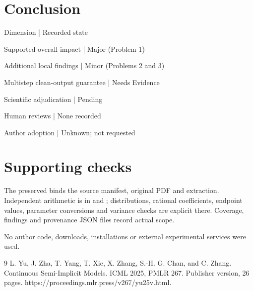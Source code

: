 \documentclass[10pt]{article}
\begin{document}
\section*{Conclusion}
Dimension | Recorded state\par
Supported overall impact | Major (Problem 1)\par
Additional local findings | Minor (Problems 2 and 3)\par
Multistep clean-output guarantee | Needs Evidence\par
Scientific adjudication | Pending\par
Human reviews | None recorded\par
Author adoption | Unknown; not requested\par
\section*{Supporting checks}
The preserved binds the source manifest, original PDF and extraction. Independent arithmetic is in and ; distributions, rational coefficients, endpoint values, parameter conversions and variance checks are explicit there. Coverage, findings and provenance JSON files record actual scope.\par
No author code, downloads, installations or external experimental services were used.\par
9 L. Yu, J. Zha, T. Yang, T. Xie, X. Zhang, S.-H. G. Chan, and C. Zhang. Continuous Semi-Implicit Models. ICML 2025, PMLR 267. Publisher version, 26 pages. https://proceedings.mlr.press/v267/yu25v.html.\par
\end{document}
